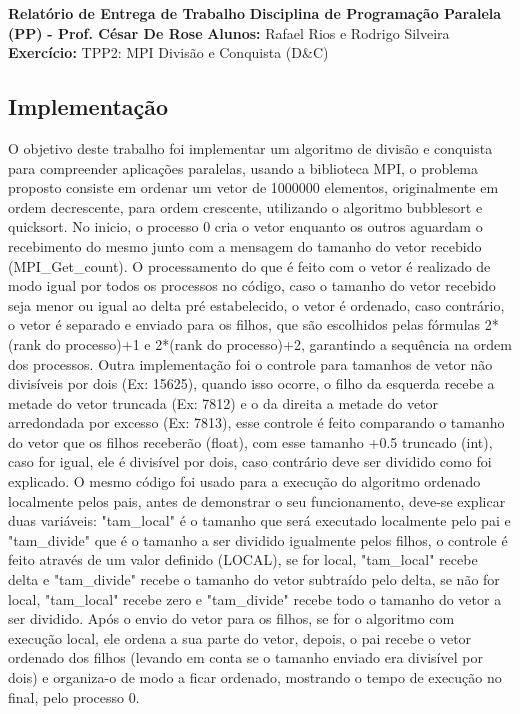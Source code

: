 \documentclass{article}
\begin{document}
\textbf{Relatório de Entrega de Trabalho} \newline
\textbf{Disciplina de Programação Paralela (PP)}\textbf{ - Prof. César De Rose} \newline
\textbf{Alunos:} Rafael Rios e Rodrigo Silveira \newline
\textbf{Exercício:} TPP2: MPI Divisão e Conquista (D\&C) \newline

\begin{multicols*}{2}

\section{Implementação}
O objetivo deste trabalho foi implementar um algoritmo de divisão e conquista para compreender aplicações paralelas, usando a biblioteca MPI, o problema proposto consiste em ordenar um vetor de 1000000 elementos, originalmente em ordem decrescente, para ordem crescente, utilizando o algoritmo bubblesort e quicksort. No inicio, o processo 0 cria o vetor enquanto os outros aguardam o recebimento do mesmo junto com a mensagem do tamanho do vetor recebido (MPI\_Get\_count). O processamento do que é feito com o vetor é realizado de modo igual por todos os processos no código, caso o tamanho do vetor recebido seja menor ou igual ao delta pré estabelecido, o vetor é ordenado, caso contrário, o vetor é separado e enviado para os filhos, que são escolhidos pelas fórmulas 2*(rank do processo)+1 e 2*(rank do processo)+2, garantindo a sequência na ordem dos processos. Outra implementação foi o controle para tamanhos de vetor não divisíveis por dois (Ex: 15625), quando isso ocorre, o filho da esquerda recebe a metade do vetor truncada (Ex: 7812) e o da direita a metade do vetor arredondada por excesso (Ex: 7813), esse controle é feito comparando o tamanho do vetor que os filhos receberão (float), com esse tamanho +0.5 truncado (int), caso for igual, ele é divisível por dois, caso contrário deve ser dividido como foi explicado. O mesmo código foi usado para a execução do algoritmo ordenado localmente pelos pais, antes de demonstrar o seu funcionamento, deve-se explicar duas variáveis: "tam\_local" é o tamanho que será executado localmente pelo pai e "tam\_divide" que é o tamanho a ser dividido igualmente pelos filhos, o controle é feito através de um valor definido (LOCAL), se for local, "tam\_local" recebe delta e "tam\_divide" recebe o tamanho do vetor subtraído pelo delta, se não for local, "tam\_local" recebe zero e "tam\_divide" recebe todo o tamanho do vetor a ser dividido. Após o envio do vetor para os filhos, se for o algoritmo com execução local, ele ordena a sua parte do vetor, depois, o pai recebe o vetor ordenado dos filhos (levando em conta se o tamanho enviado era divisível por dois) e organiza-o de modo a ficar ordenado, mostrando o tempo de execução no final, pelo processo 0.

\end{multicols*}
\end{document}
